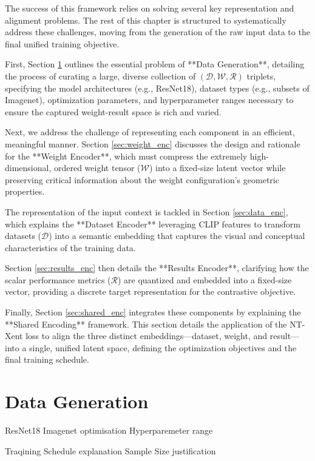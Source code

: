 The success of this framework relies on solving several key representation and alignment problems. The rest of this chapter is structured to systematically address these challenges, moving from the generation of the raw input data to the final unified training objective.

First, Section \ref{sec:data_gen} outlines the essential problem of **Data Generation**, detailing the process of curating a large, diverse collection of $(\mathcal{D}, \mathcal{W}, \mathcal{R})$ triplets, specifying the model architectures (e.g., ResNet18), dataset types (e.g., subsets of Imagenet), optimization parameters, and hyperparameter ranges necessary to ensure the captured weight-result space is rich and varied.

Next, we address the challenge of representing each component in an efficient, meaningful manner. Section \ref{sec:weight_enc} discusses the design and rationale for the **Weight Encoder**, which must compress the extremely high-dimensional, ordered weight tensor ($\mathcal{W}$) into a fixed-size latent vector while preserving critical information about the weight configuration's geometric properties.

The representation of the input context is tackled in Section \ref{sec:data_enc}, which explains the **Dataset Encoder** leveraging CLIP features to transform datasets ($\mathcal{D}$) into a semantic embedding that captures the visual and conceptual characteristics of the training data.

Section \ref{sec:results_enc} then details the **Results Encoder**, clarifying how the scalar performance metrics ($\mathcal{R}$) are quantized and embedded into a fixed-size vector, providing a discrete target representation for the contrastive objective.

Finally, Section \ref{sec:shared_enc} integrates these components by explaining the **Shared Encoding** framework. This section details the application of the NT-Xent loss to align the three distinct embeddings—dataset, weight, and result—into a single, unified latent space, defining the optimization objectives and the final training schedule.


\section{Data Generation}
\label{sec:data_gen}
ResNet18
Imagenet
optimisation
Hyperparemeter range 

Traqining Schedule explanation
Sample Size justification

